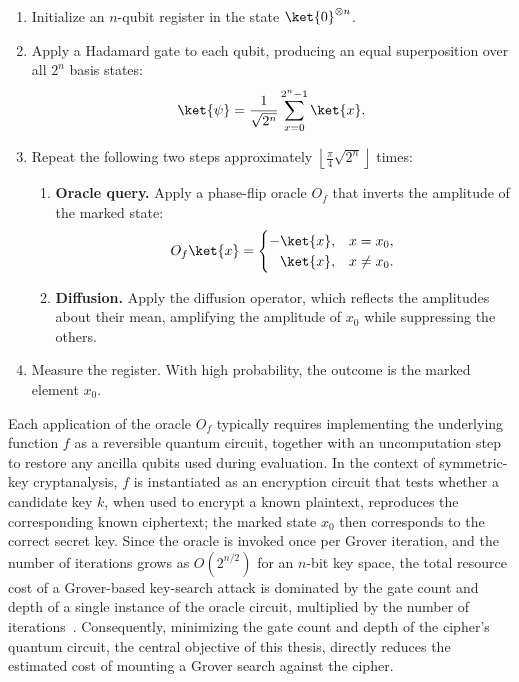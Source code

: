\begin{enumerate}
    \item Initialize an $n$-qubit register in the state $\ket{0}^{\otimes n}$.
    \item Apply a Hadamard gate to each qubit, producing an equal superposition
    over all $2^n$ basis states:
    \[
    \ket{\psi} = \frac{1}{\sqrt{2^n}} \sum_{x=0}^{2^n-1} \ket{x}.
    \]
    \item Repeat the following two steps approximately
    $\left\lfloor \frac{\pi}{4}\sqrt{2^n} \right\rfloor$ times:
    \begin{enumerate}
        \item \textbf{Oracle query.} Apply a phase-flip oracle $O_f$ that
        inverts the amplitude of the marked state:
        \[
        O_f\ket{x} =
        \begin{cases}
            -\ket{x}, & x = x_0, \\
            \phantom{-}\ket{x}, & x \neq x_0.
        \end{cases}
        \]
        \item \textbf{Diffusion.} Apply the diffusion operator, which reflects
        the amplitudes about their mean, amplifying the amplitude of $x_0$
        while suppressing the others.
    \end{enumerate}
    \item Measure the register. With high probability, the outcome is the
    marked element $x_0$.
\end{enumerate}

Each application of the oracle $O_f$ typically requires implementing the
underlying function $f$ as a reversible quantum circuit, together with an
uncomputation step to restore any ancilla qubits used during evaluation. In the
context of symmetric-key cryptanalysis, $f$ is instantiated as an encryption
circuit that tests whether a candidate key $k$, when used to encrypt a known
plaintext, reproduces the corresponding known ciphertext; the marked state
$x_0$ then corresponds to the correct secret key. Since the oracle is invoked
once per Grover iteration, and the number of iterations grows as
$O(2^{n/2})$ for an $n$-bit key space, the total resource cost of a
Grover-based key-search attack is dominated by the gate count and depth of a
single instance of the oracle circuit, multiplied by the number of
iterations~\cite{cryptoeprint:2026/1007}. Consequently, minimizing the gate count
and depth of the cipher's quantum circuit, the central objective of this
thesis, directly reduces the estimated cost of mounting a Grover search
against the cipher.
